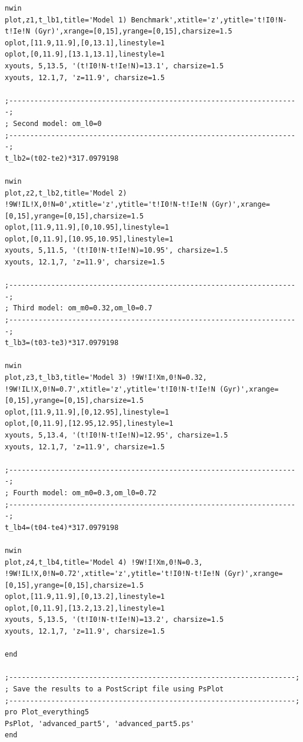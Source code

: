 \documentclass[a4paper,12pt]{article}
\begin{document}
\begin{itemize}
\begin{scriptsize}
\begin{verbatim}
nwin
plot,z1,t_lb1,title='Model 1) Benchmark',xtitle='z',ytitle='t!I0!N-t!Ie!N (Gyr)',xrange=[0,15],yrange=[0,15],charsize=1.5
oplot,[11.9,11.9],[0,13.1],linestyle=1
oplot,[0,11.9],[13.1,13.1],linestyle=1
xyouts, 5,13.5, '(t!I0!N-t!Ie!N)=13.1', charsize=1.5
xyouts, 12.1,7, 'z=11.9', charsize=1.5

;---------------------------------------------------------------------;
; Second model: om_l0=0
;---------------------------------------------------------------------;
t_lb2=(t02-te2)*317.0979198

nwin
plot,z2,t_lb2,title='Model 2) !9W!IL!X,0!N=0',xtitle='z',ytitle='t!I0!N-t!Ie!N (Gyr)',xrange=[0,15],yrange=[0,15],charsize=1.5
oplot,[11.9,11.9],[0,10.95],linestyle=1
oplot,[0,11.9],[10.95,10.95],linestyle=1
xyouts, 5,11.5, '(t!I0!N-t!Ie!N)=10.95', charsize=1.5
xyouts, 12.1,7, 'z=11.9', charsize=1.5

;---------------------------------------------------------------------;
; Third model: om_m0=0.32,om_l0=0.7
;---------------------------------------------------------------------;
t_lb3=(t03-te3)*317.0979198

nwin
plot,z3,t_lb3,title='Model 3) !9W!I!Xm,0!N=0.32, !9W!IL!X,0!N=0.7',xtitle='z',ytitle='t!I0!N-t!Ie!N (Gyr)',xrange=[0,15],yrange=[0,15],charsize=1.5
oplot,[11.9,11.9],[0,12.95],linestyle=1
oplot,[0,11.9],[12.95,12.95],linestyle=1
xyouts, 5,13.4, '(t!I0!N-t!Ie!N)=12.95', charsize=1.5
xyouts, 12.1,7, 'z=11.9', charsize=1.5

;---------------------------------------------------------------------;
; Fourth model: om_m0=0.3,om_l0=0.72
;---------------------------------------------------------------------;
t_lb4=(t04-te4)*317.0979198

nwin
plot,z4,t_lb4,title='Model 4) !9W!I!Xm,0!N=0.3, !9W!IL!X,0!N=0.72',xtitle='z',ytitle='t!I0!N-t!Ie!N (Gyr)',xrange=[0,15],yrange=[0,15],charsize=1.5
oplot,[11.9,11.9],[0,13.2],linestyle=1
oplot,[0,11.9],[13.2,13.2],linestyle=1
xyouts, 5,13.5, '(t!I0!N-t!Ie!N)=13.2', charsize=1.5
xyouts, 12.1,7, 'z=11.9', charsize=1.5

end

;--------------------------------------------------------------------;
; Save the results to a PostScript file using PsPlot
;--------------------------------------------------------------------;
pro Plot_everything5
PsPlot, 'advanced_part5', 'advanced_part5.ps'
end
\end{verbatim}
\end{scriptsize}


\end{itemize}
\end{document}
